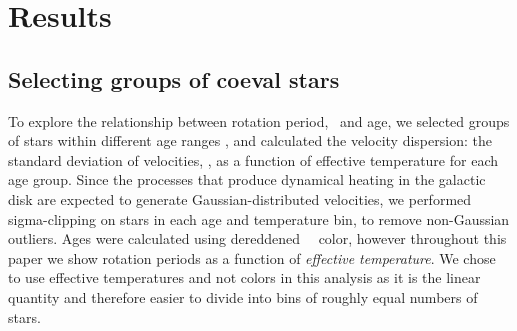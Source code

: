 \section{Results}

\subsection{Selecting groups of coeval stars}

To explore the relationship between rotation period, \teff\ and age, we
selected groups of stars within different age ranges \citep[where age was
calculated using the][gyrochronology relation]{angus2019}, and calculated the
velocity dispersion: the standard deviation of velocities, \sigmavb, as a
function of effective temperature for each age group.
Since the processes that produce dynamical heating in the galactic disk are
expected to generate Gaussian-distributed velocities, we performed
sigma-clipping on stars in each age and temperature bin, to remove
non-Gaussian outliers.
Ages were calculated using dereddened \gaia\ \gcolor\ color, however
throughout this paper we show rotation periods as a function of {\it effective
temperature}.
We chose to use effective temperatures and not colors in this analysis as it
is the linear quantity and therefore easier to divide into bins of roughly
equal numbers of stars.

